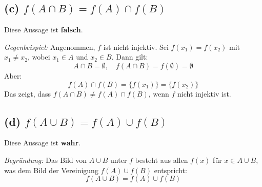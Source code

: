 \documentclass[11pt]{article}
\begin{document}
\subsection*{(c) \( f(A \cap B) = f(A) \cap f(B) \)}

Diese Aussage ist \textbf{falsch}.

\textit{Gegenbeispiel:} Angenommen, \( f \) ist nicht injektiv. Sei \( f(x_1) = f(x_2) \) mit \( x_1 \neq x_2 \), wobei \( x_1 \in A \) und \( x_2 \in B \). Dann gilt:
\[
A \cap B = \emptyset, \quad f(A \cap B) = f(\emptyset) = \emptyset
\]
Aber:
\[
f(A) \cap f(B) = \{f(x_1)\} = \{f(x_2)\}
\]
Das zeigt, dass \( f(A \cap B) \neq f(A) \cap f(B) \), wenn \( f \) nicht injektiv ist.

\subsection*{(d) \( f(A \cup B) = f(A) \cup f(B) \)}

Diese Aussage ist \textbf{wahr}.

\textit{Begründung:} Das Bild von \( A \cup B \) unter \( f \) besteht aus allen \( f(x) \) für \( x \in A \cup B \), was dem Bild der Vereinigung \( f(A) \cup f(B) \) entspricht:
\[
f(A \cup B) = f(A) \cup f(B)
\]
\end{document}
